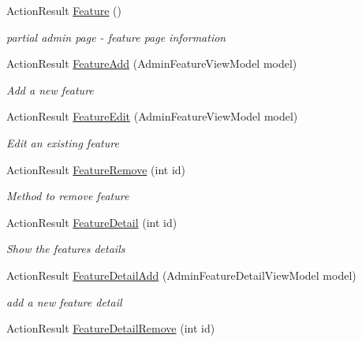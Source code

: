 \begin{DoxyCompactItemize}
Action\+Result \mbox{\hyperlink{class_ox_tots_1_1_controllers_1_1_admin_controller_ad24e4fde877f19b3bea0ec8bc25c7b43}{Feature}} ()
\begin{DoxyCompactList}\small\item\em partial admin page -\/ feature page information \end{DoxyCompactList}\item 
Action\+Result \mbox{\hyperlink{class_ox_tots_1_1_controllers_1_1_admin_controller_a74ad302e5680cccb55042bcaef8ae30b}{Feature\+Add}} (Admin\+Feature\+View\+Model model)
\begin{DoxyCompactList}\small\item\em Add a new feature \end{DoxyCompactList}\item 
Action\+Result \mbox{\hyperlink{class_ox_tots_1_1_controllers_1_1_admin_controller_a2d1cd45eee7bb3effb5533c83cefb4cd}{Feature\+Edit}} (Admin\+Feature\+View\+Model model)
\begin{DoxyCompactList}\small\item\em Edit an existing feature \end{DoxyCompactList}\item 
Action\+Result \mbox{\hyperlink{class_ox_tots_1_1_controllers_1_1_admin_controller_a8b9ff7a6f6670bebc3c057faccdd982d}{Feature\+Remove}} (int id)
\begin{DoxyCompactList}\small\item\em Method to remove feature \end{DoxyCompactList}\item 
Action\+Result \mbox{\hyperlink{class_ox_tots_1_1_controllers_1_1_admin_controller_a8aed7563cb97277b6cea0248808d9c13}{Feature\+Detail}} (int id)
\begin{DoxyCompactList}\small\item\em Show the feature\textquotesingle{}s details \end{DoxyCompactList}\item 
Action\+Result \mbox{\hyperlink{class_ox_tots_1_1_controllers_1_1_admin_controller_aacbafa114edfc14dd62f5213d311c3af}{Feature\+Detail\+Add}} (Admin\+Feature\+Detail\+View\+Model model)
\begin{DoxyCompactList}\small\item\em add a new feature detail \end{DoxyCompactList}\item 
Action\+Result \mbox{\hyperlink{class_ox_tots_1_1_controllers_1_1_admin_controller_adb1348c5710499cfe0ff85d72c00c8b2}{Feature\+Detail\+Remove}} (int id)

\end{DoxyCompactItemize}
